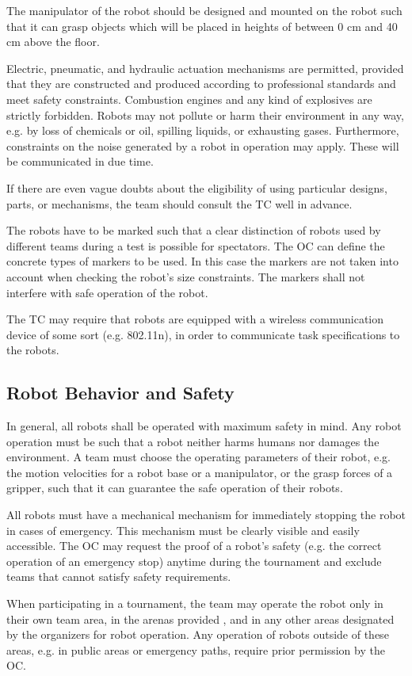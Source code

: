 \par
The manipulator of the robot should be designed and mounted on the robot such that it can grasp objects which will be placed in heights of between 0 cm and 40 cm above the floor.
\par
Electric, pneumatic, and hydraulic actuation mechanisms are permitted, provided that they are constructed and produced according to professional standards and meet safety constraints. Combustion engines and any kind of explosives are strictly forbidden. Robots may not pollute or harm their environment in any way, e.g. by loss of chemicals or oil, spilling liquids, or exhausting gases. Furthermore, constraints on the noise generated by a robot in operation may apply. These will be communicated in due time.
\par
If there are even vague doubts about the eligibility of using particular designs, parts, or mechanisms, the team should consult the TC well in advance.
\par
The robots have to be marked such that a clear distinction of robots used by different teams during a test is possible for spectators. The OC can define the concrete types of markers to be used. In this case the markers are not taken into account when checking the robot's size constraints. The markers shall not interfere with safe operation of the robot.
\par
The TC may require that robots are equipped with a wireless communication device of some sort (e.g. 802.11n), in order to communicate task specifications to the robots.

\subsection{Robot Behavior and Safety} \label{ssec:RobotBehaviorAndSafety}
In general, all robots shall be operated with maximum safety in mind. Any robot operation must be such that a robot neither harms humans nor damages the environment. A team must choose the operating parameters of their robot, e.g. the motion velocities for a robot base or a manipulator, or the grasp forces of a gripper, such that it can guarantee the safe operation of their robots.
\par
All robots must have a mechanical mechanism for immediately stopping the robot in cases of emergency. This mechanism must be clearly visible and easily accessible. The OC may request the proof of a robot's safety (e.g. the correct operation of an emergency stop) anytime during the tournament and exclude teams that cannot satisfy safety requirements.
\par
When participating in a tournament, the team may operate the robot only in their own team area, in the arenas provided , and in any other areas designated by the organizers for robot operation. Any operation of robots outside of these areas, e.g. in public areas or emergency paths, require prior permission by the OC.


